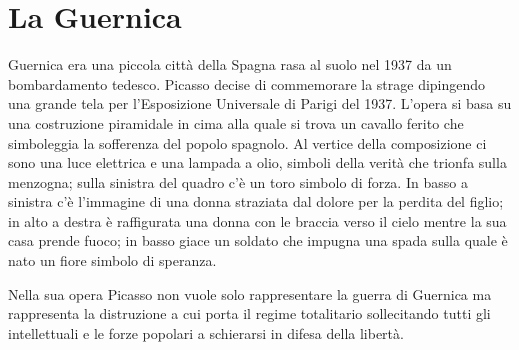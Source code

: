 \section{La Guernica}
Guernica era una piccola città della Spagna rasa al suolo nel 1937 da un bombardamento tedesco. Picasso decise di commemorare la strage dipingendo una grande tela per l'Esposizione Universale di Parigi del 1937. L'opera si basa su una costruzione piramidale in cima alla quale si trova un cavallo ferito che simboleggia la sofferenza del popolo spagnolo. Al vertice della composizione ci sono una luce elettrica e una lampada a olio, simboli della verità che trionfa sulla menzogna; sulla sinistra del quadro c'è un toro simbolo di forza. In basso a sinistra c'è l'immagine di una donna straziata dal dolore per la perdita del figlio; in alto a destra è raffigurata una donna con le braccia verso il cielo mentre la sua casa prende fuoco; in basso giace un soldato che impugna una spada sulla quale è nato un fiore simbolo di speranza.

Nella sua opera Picasso non vuole solo rappresentare la guerra di Guernica ma rappresenta la distruzione a cui porta il regime totalitario sollecitando tutti gli intellettuali e le forze popolari a schierarsi in difesa della libertà.
